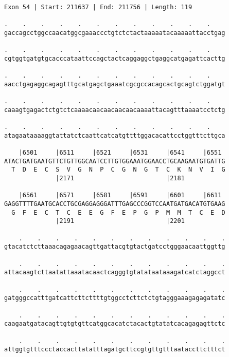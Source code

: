 \documentclass{article}
\begin{document}
\begin{Verbatim}
Exon 54 | Start: 211637 | End: 211756 | Length: 119
 
.    .    .    .    .    .    .    .    .    .    .    .    
gaccagcctggccaacatggcgaaaccctgtctctactaaaaatacaaaaattacctgag
  
.    .    .    .    .    .    .    .    .    .    .    .    
cgtggtgatgtgcacccataattccagctactcaggaggctgaggcatgagattcacttg
  
.    .    .    .    .    .    .    .    .    .    .    .    
aacctgagaggcagagtttgcatgagctgaaatcgcgccacagcactgcagtctggatgt
  
.    .    .    .    .    .    .    .    .    .    .    .    
caaagtgagactctgtctcaaaacaacaacaacaacaaaattacagtttaaaatcctctg
  
.    .    .    .    .    .    .    .    .    .    .    .    
atagaataaaaggtattatctcaattcatcatgttttggacacattcctggtttcttgca
  
    |6501     |6511     |6521     |6531     |6541     |6551 
ATACTGATGAATGTTCTGTTGGCAATCCTTGTGGAAATGGAACCTGCAAGAATGTGATTG
  T  D  E  C  S  V  G  N  P  C  G  N  G  T  C  K  N  V  I  G
              |2171                         |2181           
  
    |6561     |6571     |6581     |6591     |6601     |6611 
GAGGTTTTGAATGCACCTGCGAGGAGGGATTTGAGCCCGGTCCAATGATGACATGTGAAG
  G  F  E  C  T  C  E  E  G  F  E  P  G  P  M  M  T  C  E  D
              |2191                         |2201           
  
    .    .    .    .    .    .    .    .    .    .    .    .
gtacatctcttaaacagagaacagttgattacgtgtactgatcctgggaacaattggttg
  
    .    .    .    .    .    .    .    .    .    .    .    .
attacaagtcttaatattaaatacaactcagggtgtatataataaagatcatctaggcct
  
    .    .    .    .    .    .    .    .    .    .    .    .
gatgggccatttgatcattcttcttttgtggcctcttctctgtagggaaagagagatatc
  
    .    .    .    .    .    .    .    .    .    .    .    .
caagaatgatacagttgtgtgttcatggcacatctacactgtatatcacagagagttctc
  
    .    .    .    .    .    .    .    .    .    .    .    .
attggtgtttccctaccacttatatttagatgcttccgtgttgtttaataccttctttct
\end{Verbatim}
\newpage
\end{document}
